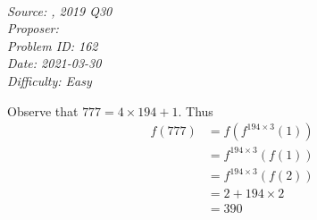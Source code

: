\SSbreak\\
\emph{Source: \Casmc, 2019 Q30}\\
\emph{Proposer: \Pbrain}\\
\emph{Problem ID: 162}\\
\emph{Date: 2021-03-30}\\
\emph{Difficulty: Easy}\\
\SSbreak
 
\bigskip

\begin{solution}\hfil\medskip
Observe that \(777 = 4 \times 194 + 1\). Thus
\begin{align*}
	f(777) &= f(f^{194 \times 3}(1)) \\
	&= f^{194 \times 3} (f(1)) \\
	&= f^{194 \times 3} (f(2)) \\
	&= 2 + 194 \times 2 \\
	&= \boxed{390}
\end{align*}

\end{solution}\bigskip
